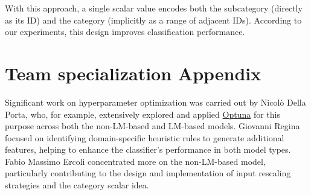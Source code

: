 \documentclass[11pt]{article}
\begin{document}
	With this approach, a single scalar value encodes both the subcategory (directly as its ID) and the category (implicitly as a range of adjacent IDs). According to our experiments, this design improves classification performance.
	
	\section{Team specialization Appendix}
	\label{sec:appendix}
	
	Significant work on hyperparameter optimization was carried out by Nicolò Della Porta, who, for example, extensively explored and applied \href{https://optuna.org/}{Optuna}  for this purpose across both the non-LM-based and LM-based models. Giovanni Regina focused on identifying domain-specific heuristic rules to generate additional features, helping to enhance the classifier’s performance in both model types. Fabio Massimo Ercoli concentrated more on the non-LM-based model, particularly contributing to the design and implementation of input rescaling strategies and the category scalar idea.
	
\end{document}
